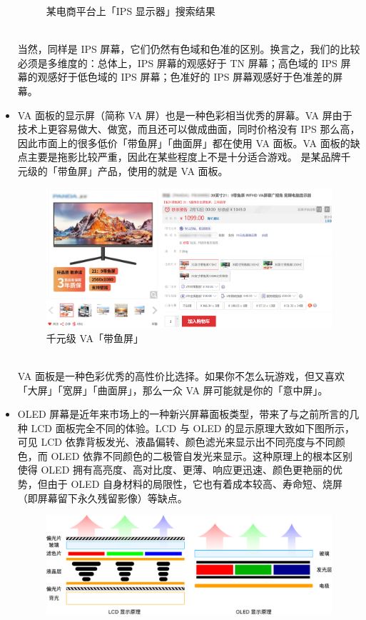 \begin{itemize}
\begin{figure}[htb!]
      \caption{某电商平台上「IPS 显示器」搜索结果}
      \label{fig:IPS_screens}
    \end{figure}\\
    当然，同样是 IPS 屏幕，它们仍然有色域和色准的区别。换言之，我们的比较必须是多维度的：总体上，IPS 屏幕的观感好于 TN 屏幕；高色域的 IPS 屏幕的观感好于低色域的 IPS 屏幕；色准好的 IPS 屏幕观感好于色准差的屏幕。
  \item VA 面板的显示屏（简称 VA 屏）也是一种色彩相当优秀的屏幕。VA 屏由于技术上更容易做大、做宽，而且还可以做成曲面，同时价格没有 IPS 那么高，因此市面上的很多低价「带鱼屏」「曲面屏」都在使用 VA 面板。VA 面板的缺点主要是拖影比较严重，因此在某些程度上不是十分适合游戏。 是某品牌千元级的「带鱼屏」产品，使用的就是 VA 面板。
    \begin{figure}[htb!]
      \centering
      \includegraphics[width=.8\textwidth]{assets/advanced/Cheap_VA_screen.png}
      \caption{千元级 VA「带鱼屏」}
      \label{fig:Cheap_VA_screen}
    \end{figure}\\
    VA 面板是一种色彩优秀的高性价比选择。如果你不怎么玩游戏，但又喜欢「大屏」「宽屏」「曲面屏」，那么一众 VA 屏可能就是你的「意中屏」。
  \item OLED 屏幕是近年来市场上的一种新兴屏幕面板类型，带来了与之前所言的几种 LCD 面板完全不同的体验。LCD 与 OLED 的显示原理大致如下图所示，可见 LCD 依靠背板发光、液晶偏转、颜色滤光来显示出不同亮度与不同颜色，而 OLED 依靠不同颜色的二极管自发光来显示。这种原理上的根本区别使得 OLED 拥有高亮度、高对比度、更薄、响应更迅速、颜色更艳丽的优势，但由于 OLED 自身材料的局限性，它也有着成本较高、寿命短、烧屏（即屏幕留下永久残留影像）等缺点。
    \begin{figure}[htb!]
      \centering
      \includegraphics[width=.95\textwidth]{assets/advanced/LCD_OLED.pdf}

\end{figure}
\end{itemize}
